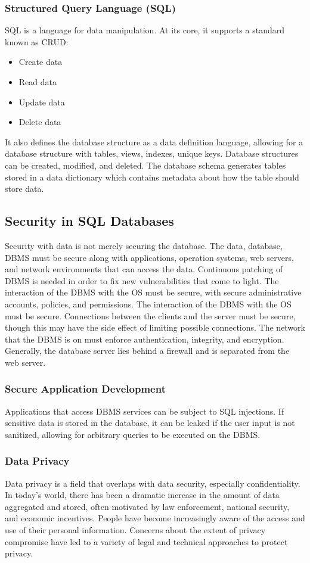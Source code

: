 \documentclass{math}
\begin{document}
\subsubsection*{Structured Query Language (SQL)}
SQL is a language for data manipulation. At its core, it supports a standard
known as CRUD:
\begin{itemize}
  \item Create data
  \item Read data
  \item Update data
  \item Delete data
\end{itemize}
It also defines the database structure as a data definition language, allowing
for a database structure with tables, views, indexes, unique keys. Database
structures can be created, modified, and deleted. The database schema generates
tables stored in a data dictionary which contains metadata about how the table
should store data.

\subsection*{Security in SQL Databases}
Security with data is not merely securing the database. The data, database,
DBMS must be secure along with applications, operation systems, web servers,
and network environments that can access the data. Continuous patching of DBMS
is needed in order to fix new vulnerabilities that come to light. The
interaction of the DBMS with the OS must be secure, with secure administrative
accounts, policies, and permissions. The interaction of the DBMS with the OS
must be secure. Connections between the clients and the server must be secure,
though this may have the side effect of limiting possible connections. The
network that the DBMS is on must enforce authentication, integrity, and
encryption. Generally, the database server lies behind a firewall and is
separated from the web server.

\subsubsection*{Secure Application Development}
Applications that access DBMS services can be subject to SQL injections. If
sensitive data is stored in the database, it can be leaked if the user input
is not sanitized, allowing for arbitrary queries to be executed on the DBMS.

\subsubsection*{Data Privacy}
Data privacy is a field that overlaps with data security, especially
confidentiality. In today's world, there has been a dramatic increase in the
amount of data aggregated and stored, often motivated by law enforcement,
national security, and economic incentives. People have become increasingly
aware of the access and use of their personal information. Concerns about the
extent of privacy compromise have led to a variety of legal and technical
approaches to protect privacy.
\end{document}
